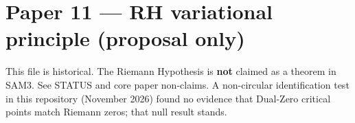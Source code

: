 \documentclass[11pt]{article}
\begin{document}
\section*{Paper 11 — RH variational principle (proposal only)}
This file is historical. The Riemann Hypothesis is \textbf{not} claimed as a theorem in SAM3.
See STATUS and core paper non-claims.
A non-circular identification test in this repository (November 2026) found no evidence that Dual-Zero critical points match Riemann zeros; that null result stands.
\end{document}
